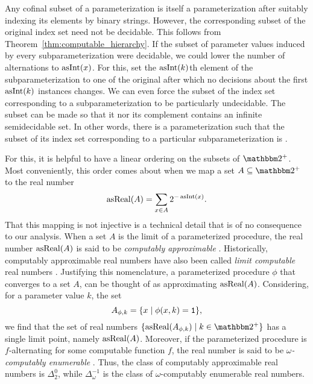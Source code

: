 Any cofinal subset of a parameterization is itself a parameterization after suitably indexing its elements by binary strings.
However, the corresponding subset of the original index set need not be decidable.
This follows from Theorem~\ref{thm:computable_hierarchy}.
If the subset of parameter values induced by every subparameterization were decidable, we could lower the number of alternations to $\operatorname{asInt}(x)$.
For this, set the $\operatorname{asInt}(k)$th element of the subparameterization to one of the original after which no decisions about the first $\operatorname{asInt}(k)$ instances changes.
We can even force the subset of the index set corresponding to a subparameterization to be particularly undecidable.
The subset can be made so that it nor its complement contains an infinite semidecidable set.
In other words, there is a parameterization such that the subset of its index set corresponding to a particular subparameterization is  \parencite{rogers1967theory,odifreddi1992classical}.

For this, it is helpful to have a linear ordering on the subsets of $\binary^+$.
Most conveniently, this order comes about when we map a set $A \subseteq \binary^+$ to the real number
\begin{equation*}
  \operatorname{asReal}(A) = \sum_{x \in A} 2^{-\operatorname{asInt}(x)}.
\end{equation*}
That this mapping is not injective is a technical detail that is of no consequence to our analysis.
When a set $A$ is the limit of a parameterized procedure, the real number $\operatorname{asReal}(A)$ is said to be \emph{computably approximable} \parencite{ambos-spies2000weakly}.
Historically, computably approximable real numbers have also been called \emph{limit computable} real numbers \parencite{gold1965limiting}.
Justifying this nomenclature, a parameterized procedure $\phi$ that converges to a set $A$, can be thought of as approximating $\operatorname{asReal}(A)$.
Considering, for a parameter value $k$, the set
\begin{equation*}
  A_{\phi, k} = \{x \;{|}\; \phi(x, k) = \textnormal{\texttt{1}}\},
\end{equation*}
we find that the set of real numbers $\{\asReal(A_{\phi, k}) \st k \in \binary^+\}$ has a single limit point, namely $\operatorname{asReal}(A)$.
Moreover, if the parameterized procedure is $f$-alternating for some computable function $f$, the real number is said to be \emph{$\omega$-computably enumerable} \parencite{ambos-spies2000weakly}.
Thus, the class of computably approximable real numbers is $\Delta^0_2$, while $\Delta^{-1}_\omega$ is the class of $\omega$-computably enumerable real numbers.

